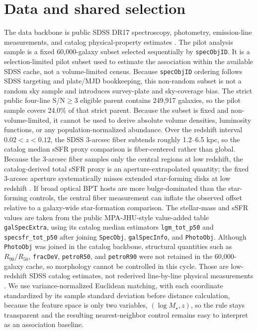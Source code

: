 \documentclass[twocolumn]{aastex631}
\begin{document}
\section{Data and shared selection}
The data backbone is public SDSS DR17 spectroscopy, photometry, emission-line measurements, and catalog physical-property estimates \citep{york2000,sdssdr17,brinchmann2004}. The pilot analysis sample is a fixed 60,000-galaxy subset selected sequentially by \texttt{specObjID}. It is a selection-limited pilot subset used to estimate the association within the available SDSS cache, not a volume-limited census. Because \texttt{specObjID} ordering follows SDSS targeting and plate/MJD bookkeeping, this non-random subset is not a random sky sample and introduces survey-plate and sky-coverage bias. The strict public four-line S/N$\geq3$ eligible parent contains 249,917 galaxies, so the pilot sample covers 24.0\% of that strict parent. Because the subset is fixed and non-volume-limited, it cannot be used to derive absolute volume densities, luminosity functions, or any population-normalized abundance.
Over the redshift interval $0.02<z<0.12$, the SDSS 3-arcsec fiber subtends roughly 1.2--6.5 kpc, so the catalog median sSFR proxy comparison is fiber-centered rather than global.
Because the 3-arcsec fiber samples only the central regions at low redshift, the catalog-derived total sSFR proxy is an aperture-extrapolated quantity; the fixed 3-arcsec aperture systematically misses extended star-forming disks at low redshift \citep{kewley2005}. If broad optical BPT hosts are more bulge-dominated than the star-forming controls, the central fiber measurement can inflate the observed offset relative to a galaxy-wide star-formation comparison.
The stellar-mass and sSFR values are taken from the public MPA-JHU-style value-added table \texttt{galSpecExtra}, using its catalog median estimators \texttt{lgm\_tot\_p50} and \texttt{specsfr\_tot\_p50} after joining \texttt{SpecObj}, \texttt{galSpecInfo}, and \texttt{PhotoObj}. Although \texttt{PhotoObj} was joined in the catalog backbone, structural quantities such as \(R_{90}/R_{50}\), \texttt{fracDeV}, \texttt{petroR50}, and \texttt{petroR90} were not retained in the 60,000-galaxy cache, so morphology cannot be controlled in this cycle. Those are low-redshift SDSS catalog estimates, not rederived line-by-line physical measurements \citep{brinchmann2004,sdssdr17,york2000}. We use variance-normalized Euclidean matching, with each coordinate standardized by its sample standard deviation before distance calculation, because the feature space is only two variables, $(\log M_\star,z)$, so the rule stays transparent and the resulting nearest-neighbor control remains easy to interpret as an association baseline.
\end{document}
